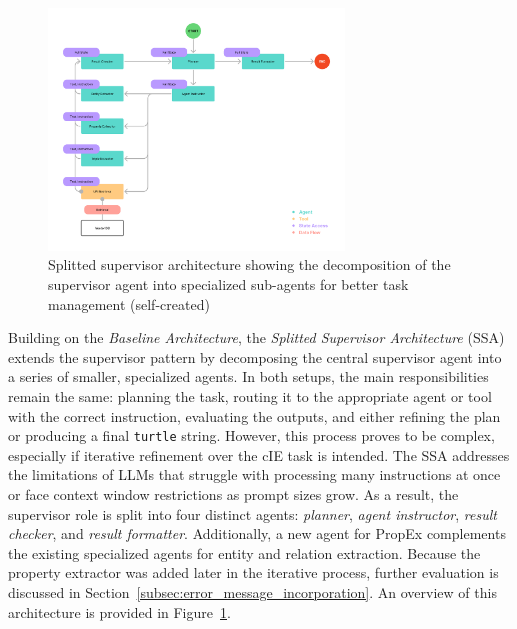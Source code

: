 \documentclass[a4paper,oneside,bibliography=totoc]{scrbook}
\begin{document}
\begin{figure}[tp]
  \centering
  \includegraphics[width=0.7\textwidth]{figures/Splitted Supervisor Architecture.png}
  \caption[Splitted supervisor architecture showing the decomposition of the supervisor agent into specialized sub-agents for better task management]{Splitted supervisor architecture showing the decomposition of the supervisor agent into specialized sub-agents for better task management (self-created)}
  \label{fig:splitted_supervisor_architecture}
\end{figure}

Building on the \textit{Baseline Architecture}, the \textit{Splitted Supervisor Architecture} (\ac{SSA}) extends the supervisor pattern by decomposing the central supervisor agent into a series of smaller, specialized agents. In both setups, the main responsibilities remain the same: planning the task, routing it to the appropriate agent or tool with the correct instruction, evaluating the outputs, and either refining the plan or producing a final \texttt{turtle} string. However, this process proves to be complex, especially if iterative refinement over the \ac{cIE} task is intended. The \ac{SSA} addresses the limitations of \acp{LLM} that struggle with processing many instructions at once or face context window restrictions as prompt sizes grow. As a result, the supervisor role is split into four distinct agents: \textit{planner}, \textit{agent instructor}, \textit{result checker}, and \textit{result formatter}. Additionally, a new agent for \ac{PropEx} complements the existing specialized agents for entity and relation extraction. Because the property extractor was added later in the iterative process, further evaluation is discussed in Section~\ref{subsec:error_message_incorporation}. An overview of this architecture is provided in Figure~\ref{fig:splitted_supervisor_architecture}.
\end{document}
